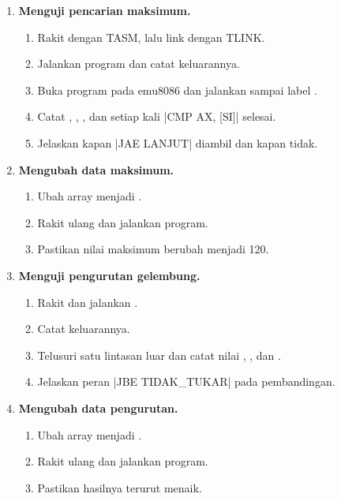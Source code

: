 \begin{enumerate}
    \item \textbf{Menguji pencarian maksimum.}
    \begin{enumerate}
        \item Rakit  dengan TASM, lalu link
              dengan TLINK.
        \item Jalankan program dan catat keluarannya.
        \item Buka program pada emu8086 dan jalankan
               sampai label .
        \item Catat , , , dan 
              setiap kali \lstasm|CMP AX, [SI]| selesai.
        \item Jelaskan kapan \lstasm|JAE LANJUT| diambil dan kapan
              tidak.
    \end{enumerate}

    \item \textbf{Mengubah data maksimum.}
    \begin{enumerate}
        \item Ubah array menjadi .
        \item Rakit ulang dan jalankan program.
        \item Pastikan nilai maksimum berubah menjadi 120.
    \end{enumerate}

    \item \textbf{Menguji pengurutan gelembung.}
    \begin{enumerate}
        \item Rakit dan jalankan .
        \item Catat keluarannya.
        \item Telusuri satu lintasan luar dan catat nilai ,
              , dan .
        \item Jelaskan peran \lstasm|JBE TIDAK_TUKAR| pada
              pembandingan.
    \end{enumerate}

    \item \textbf{Mengubah data pengurutan.}
    \begin{enumerate}
        \item Ubah array menjadi .
        \item Rakit ulang dan jalankan program.
        \item Pastikan hasilnya terurut menaik.
    \end{enumerate}


\end{enumerate}
